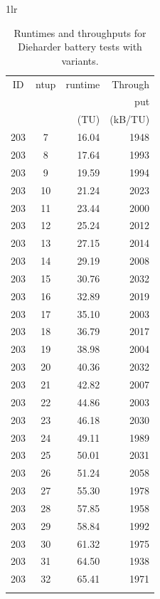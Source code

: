 \documentclass[
  digital,     %
  oneside,     %
  nosansbold,  %
  nocolorbold, %
  nolof,         %
  nolot,         %
]{fithesis4}
\begin{document}
\begin{table}[H]
\begin{tabularx}{1\textwidth}{lr}
    {\begin{tabularx}{0.5\textwidth}{c|c|r|r}
       ID & ntup & runtime & Through\\
         & & & put \\
         & & (TU) & (kB/TU) \\
        \midrule 
        203 & 7 & 16.04 & 1948 \\
        203 & 8 & 17.64 & 1993 \\
        203 & 9 & 19.59 & 1994 \\
        203 & 10 & 21.24 & 2023 \\
        203 & 11 & 23.44 & 2000 \\
        203 & 12 & 25.24 & 2012 \\
        203 & 13 & 27.15 & 2014 \\
        203 & 14 & 29.19 & 2008 \\
        203 & 15 & 30.76 & 2032 \\
        203 & 16 & 32.89 & 2019 \\
        203 & 17 & 35.10 & 2003 \\
        203 & 18 & 36.79 & 2017 \\
        203 & 19 & 38.98 & 2004 \\
        203 & 20 & 40.36 & 2032 \\
        203 & 21 & 42.82 & 2007 \\
        203 & 22 & 44.86 & 2003 \\
        203 & 23 & 46.18 & 2030 \\
        203 & 24 & 49.11 & 1989 \\
        203 & 25 & 50.01 & 2031 \\
        203 & 26 & 51.24 & 2058 \\
        203 & 27 & 55.30 & 1978 \\
        203 & 28 & 57.85 & 1958 \\
        203 & 29 & 58.84 & 1992 \\
        203 & 30 & 61.32 & 1975 \\
        203 & 31 & 64.50 & 1938 \\
        203 & 32 & 65.41 & 1971 \\
         \\

    \end{tabularx}} 
  \end{tabularx}
  \caption{Runtimes and throughputs for Dieharder battery tests with variants.}
  \label{tab:analysis_time_dieharder_variants}
\end{table}
\end{document}
